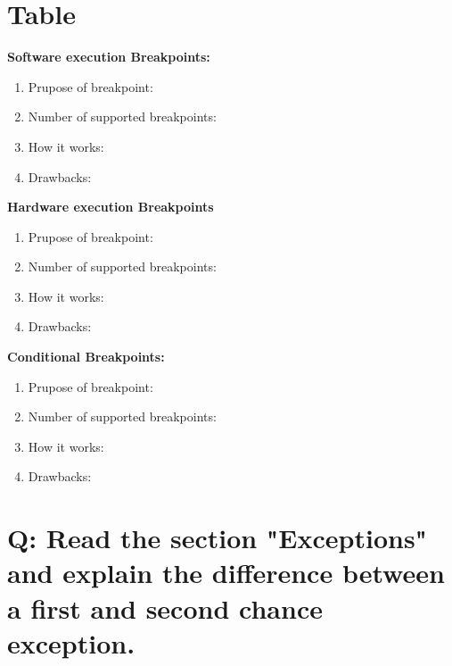 \documentclass[10pt,a4paper]{article} %
\begin{document}

    \section{Table}


        \textbf{Software execution Breakpoints:}
        \begin{enumerate}
            \item {Prupose of breakpoint:}
            \item {Number of supported breakpoints:}
            \item {How it works:}
            \item {Drawbacks:}
        \end{enumerate}

        \textbf{Hardware execution Breakpoints}
        \begin{enumerate}
            \item {Prupose of breakpoint:}
            \item {Number of supported breakpoints:}
            \item {How it works:}
            \item {Drawbacks:}
        \end{enumerate}

        \textbf{Conditional Breakpoints:}
        \begin{enumerate}
            \item {Prupose of breakpoint:}
            \item {Number of supported breakpoints:}
            \item {How it works:}
            \item {Drawbacks:}
        \end{enumerate}



    \section{Q: Read the section "Exceptions" and explain the difference
    between a first and second chance exception.}




\end{document}
